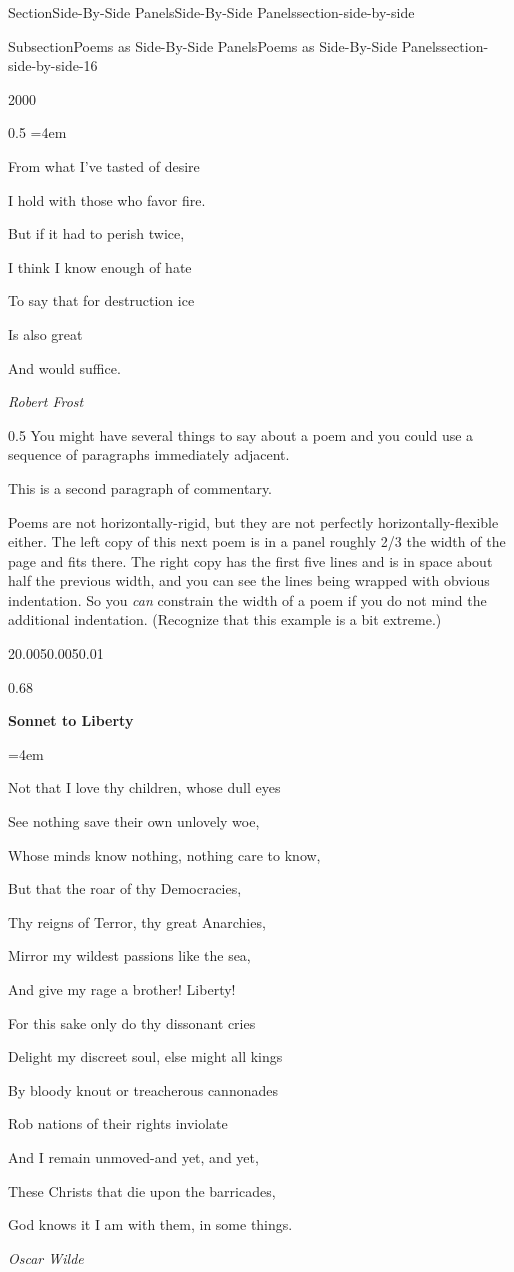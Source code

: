\documentclass[twoside,10pt,]{article}
\numberwithin{equation}{section}
\newenvironment{poem}{\setlength{\parindent}{0em}}{}
\newcommand{\poemTitle}[1]{\begin{center}\large\textbf{#1}\end{center}}
\newenvironment{stanza}{\vspace{0.25 em}\hangindent=4em}{\vspace{1 em}}
\newcommand{\poemauthorleft}[1]{\vspace{-1em}\begin{flushleft}\textit{#1}\end{flushleft}}
\newcommand{\poemlineleft}[1]{{\raggedright{#1}\par}\vspace{-\parskip}}
\begin{document}
\begin{sectionptx}{Section}{Side-By-Side Panels}{}{Side-By-Side Panels}{}{}{section-side-by-side}
\begin{subsectionptx}{Subsection}{Poems as Side-By-Side Panels}{}{Poems as Side-By-Side Panels}{}{}{section-side-by-side-16}
\begin{sidebyside}{2}{0}{0}{0}
\begin{sbspanel}{0.5}
\begin{poem}
\begin{stanza}
\poemlineleft{From what I've tasted of desire}
\poemlineleft{I hold with those who favor fire.}
\poemlineleft{But if it had to perish twice,}
\poemlineleft{I think I know enough of hate}
\poemlineleft{To say that for destruction ice}
\poemlineleft{Is also great}
\poemlineleft{And would suffice.}
\end{stanza}
\poemauthorleft{Robert Frost}
\end{poem}
\end{sbspanel}%
\begin{sbspanel}{0.5}%
You might have several things to say about a poem and you could use a sequence of paragraphs immediately adjacent.%
\par
This is a second paragraph of commentary.%
\end{sbspanel}%
\end{sidebyside}%
\par
Poems are not horizontally-rigid, but they are not perfectly horizontally-flexible either.  The left copy of this next poem is in a panel roughly 2\slash{}3 the width of the page and fits there.  The right copy has the first five lines and is in space about half the previous width, and you can see the lines being wrapped with obvious indentation.  So you \emph{can} constrain the width of a poem if you do not mind the additional indentation.  (Recognize that this example is a bit extreme.)%
\begin{sidebyside}{2}{0.005}{0.005}{0.01}%
\begin{sbspanel}{0.68}%
\begin{poem}%
\poemTitle{Sonnet to Liberty}
%
\begin{stanza}
\poemlineleft{Not that I love thy children, whose dull eyes}
\poemlineleft{See nothing save their own unlovely woe,}
\poemlineleft{Whose minds know nothing, nothing care to know,}
\poemlineleft{But that the roar of thy Democracies,}
\poemlineleft{Thy reigns of Terror, thy great Anarchies,}
\poemlineleft{Mirror my wildest passions like the sea,}
\poemlineleft{And give my rage a brother! Liberty!}
\poemlineleft{For this sake only do thy dissonant cries}
\poemlineleft{Delight my discreet soul, else might all kings}
\poemlineleft{By bloody knout or treacherous cannonades}
\poemlineleft{Rob nations of their rights inviolate}
\poemlineleft{And I remain unmoved-and yet, and yet,}
\poemlineleft{These Christs that die upon the barricades,}
\poemlineleft{God knows it I am with them, in some things.}
\end{stanza}
\poemauthorleft{Oscar Wilde}

\end{poem}
\end{sbspanel}
\end{sidebyside}
\end{subsectionptx}
\end{sectionptx}
\end{document}
